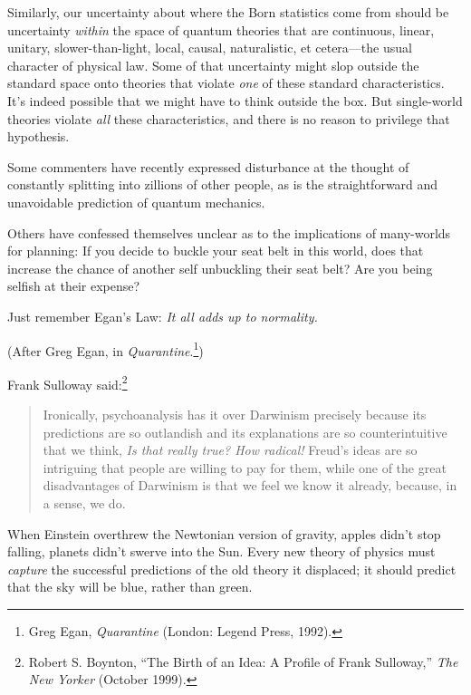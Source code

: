 {
 Similarly, our uncertainty about where the Born statistics come
from should be uncertainty \textit{within} the space of quantum
theories that are continuous, linear, unitary, slower-than-light,
local, causal, naturalistic, et cetera---the usual character of
physical law. Some of that uncertainty might slop outside the standard
space onto theories that violate \textit{one} of these standard
characteristics. It's indeed possible that we might
have to think outside the box. But single-world theories violate
\textit{all} these characteristics, and there is no reason to privilege
that hypothesis.}

\myendsectiontext


{
 Some commenters have recently expressed disturbance at the thought
of constantly splitting into zillions of other people, as is the
straightforward and unavoidable prediction of quantum mechanics. }

{
 Others have confessed themselves unclear as to the implications of
many-worlds for planning: If you decide to buckle your seat belt in
this world, does that increase the chance of another self unbuckling
their seat belt? Are you being selfish at their expense?}

{
 Just remember Egan's Law: \textit{It all adds up
to normality.}}

{
 (After Greg Egan, in \textit{Quarantine}.\footnote{Greg Egan, \textit{Quarantine} (London: Legend Press, 1992).})}

{
 Frank Sulloway said:\footnote{Robert S. Boynton, ``The Birth of an Idea: A
Profile of Frank Sulloway,'' \textit{The New Yorker}
(October 1999).}}

\begin{quote}
{
 Ironically, psychoanalysis has it over Darwinism precisely because
its predictions are so outlandish and its explanations are so
counterintuitive that we think, \textit{Is that really true? How
radical!} Freud's ideas are so intriguing that people
are willing to pay for them, while one of the great disadvantages of
Darwinism is that we feel we know it already, because, in a sense, we
do.}
\end{quote}

{
 When Einstein overthrew the Newtonian version of gravity, apples
didn't stop falling, planets didn't
swerve into the Sun. Every new theory of physics must \textit{capture}
the successful predictions of the old theory it displaced; it should
predict that the sky will be blue, rather than green.}

